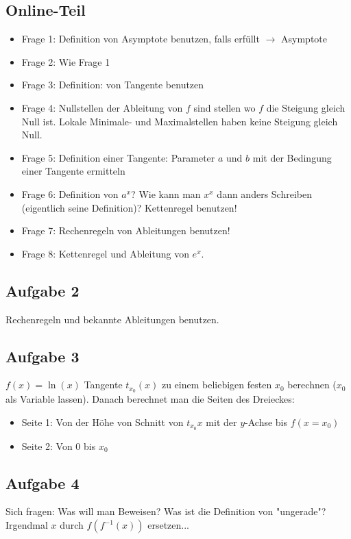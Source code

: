 \documentclass[11pt]{article} %
\begin{document}
\subsection{Online-Teil}
\begin{itemize}
\item Frage 1: Definition von Asymptote benutzen, falls erfüllt $\rightarrow$ Asymptote
\item Frage 2: Wie Frage 1
\item Frage 3: Definition: von Tangente benutzen
\item Frage 4: Nullstellen der Ableitung von $f$ sind stellen wo $f$ die Steigung gleich Null ist. Lokale Minimale- und Maximalstellen haben keine Steigung gleich Null. 
\item Frage 5: Definition einer Tangente: Parameter $a$ und $b$ mit der Bedingung einer Tangente ermitteln
\item Frage 6: Definition von $a^x$? Wie kann man $x^x$ dann anders Schreiben (eigentlich seine Definition)? Kettenregel benutzen!
\item Frage 7: Rechenregeln von Ableitungen benutzen!
\item Frage 8: Kettenregel und Ableitung von $e^x$.
\end{itemize}

\subsection{Aufgabe 2}
Rechenregeln und bekannte Ableitungen benutzen.

\subsection{Aufgabe 3}
$f(x) = \ln(x)$
Tangente $t_{x_0}(x)$ zu einem beliebigen festen $x_0$ berechnen ($x_0$ als Variable lassen). Danach berechnet man die Seiten des Dreieckes:
\begin{itemize}
\item Seite 1: Von der Höhe von Schnitt von $t_{x_0}{x}$ mit der $y$-Achse bis $f(x=x_0)$
\item Seite 2: Von $0$ bis $x_0$
\end{itemize}

\subsection{Aufgabe 4}
Sich fragen: Was will man Beweisen? Was ist die Definition von "ungerade"? Irgendmal $x$ durch $f(f^{-1}(x))$ ersetzen...
\end{document}
